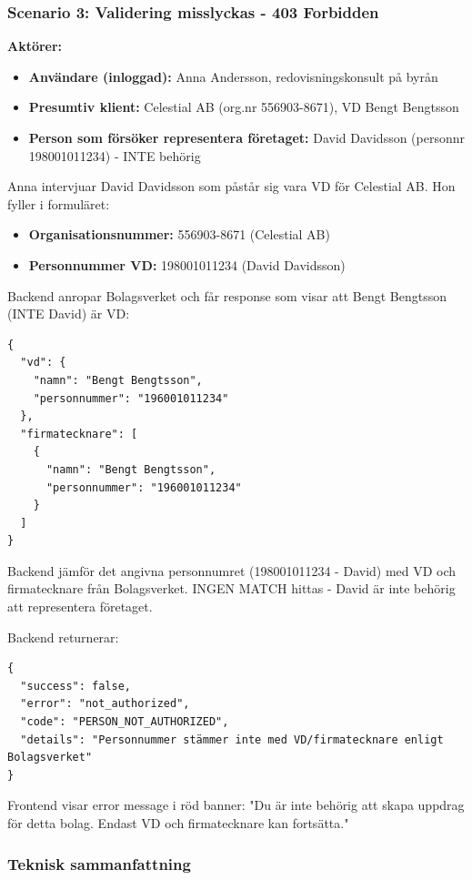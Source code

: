 \documentclass[12pt,a4paper]{article}
\begin{document}
\subsubsection{Scenario 3: Validering misslyckas - 403 Forbidden}

\textbf{Aktörer:}
\begin{itemize}[noitemsep]
  \item \textbf{Användare (inloggad):} Anna Andersson, redovisningskonsult på byrån
  \item \textbf{Presumtiv klient:} Celestial AB (org.nr 556903-8671), VD Bengt Bengtsson
  \item \textbf{Person som försöker representera företaget:} David Davidsson (personnr 198001011234) - INTE behörig
\end{itemize}

Anna intervjuar David Davidsson som påstår sig vara VD för Celestial AB. Hon fyller i formuläret:
\begin{itemize}[noitemsep]
  \item \textbf{Organisationsnummer:} 556903-8671 (Celestial AB)
  \item \textbf{Personnummer VD:} 198001011234 (David Davidsson)
\end{itemize}

Backend anropar Bolagsverket och får response som visar att Bengt Bengtsson (INTE David) är VD:
\begin{lstlisting}
{
  "vd": {
    "namn": "Bengt Bengtsson",
    "personnummer": "196001011234"
  },
  "firmatecknare": [
    {
      "namn": "Bengt Bengtsson",
      "personnummer": "196001011234"
    }
  ]
}
\end{lstlisting}

Backend jämför det angivna personnumret (198001011234 - David) med VD och firmatecknare från Bolagsverket. INGEN MATCH hittas - David är inte behörig att representera företaget.

Backend returnerar:
\begin{lstlisting}
{
  "success": false,
  "error": "not_authorized",
  "code": "PERSON_NOT_AUTHORIZED",
  "details": "Personnummer stämmer inte med VD/firmatecknare enligt Bolagsverket"
}
\end{lstlisting}

Frontend visar error message i röd banner: "Du är inte behörig att skapa uppdrag för detta bolag. Endast VD och firmatecknare kan fortsätta."

\subsubsection{Teknisk sammanfattning}
\end{document}
